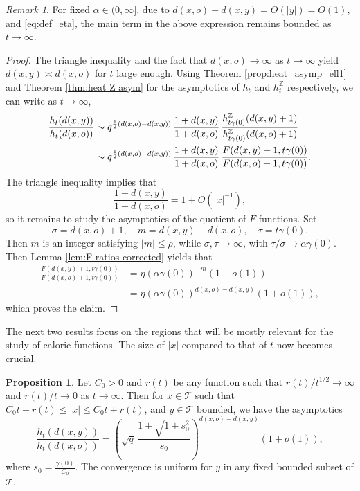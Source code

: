 \documentclass[10pt,a4paper]{amsart}
\renewcommand\mathcal{\mathscr}
\theoremstyle{plain}
\theoremstyle{remark}
\newtheorem{remark}[theorem]{Remark}
\theoremstyle{definition}
\newtheorem{proposition}[theorem]{Proposition}
\begin{document}
\begin{remark}
    For fixed $\alpha\in(0,\infty]$, due to 
$d(x,o)-d(x,y)=O(|y|)=O(1),
$
and \eqref{eq:def_eta},
the main term in the above expression remains bounded as $t\to\infty$.
\end{remark}

    \begin{proof}  The triangle inequality and the fact that $d(x,o)\to \infty$ as $t\to \infty$ yield $d(x,y)\asymp d(x,o)$ for $t$ large enough. 
    Using Theorem \ref{prop:heat_asymp_ell1} and Theorem \ref{thm:heat Z asym} for the asymptotics of $h_t$ and $h_t^{\mathbb{Z}}$ respectively, we can write as $t\to \infty$,
		\begin{align}\label{eq:quotientforL1}
			\frac{h_{t}(d(x,y))}{h_{t}(d(x,o))}&\sim q^{\frac{1}{2}(d(x,o)-d(x,y))}\,\frac{1+d(x,y)}{1+d(x,o)}\,  \frac{h_{t\gamma(0)}^{\mathbb{Z}}(d(x,y)+1)}{h_{t\gamma(0)}^{\mathbb{Z}}(d(x,o)+1)} \notag\\
            &\sim q^{\frac{1}{2}(d(x,o)-d(x,y))}\,\frac{1+d(x,y)}{1+d(x,o)}\,  \frac{F(d(x,y)+1, t\gamma(0))}{F(d(x,o)+1, t\gamma(0))}.
		\end{align}
		The triangle inequality implies that $$\frac{1+d(x,y)}{1+d(x,o)} =1+O(|x|^{-1}),$$ so it remains to study the asymptotics of the quotient of $F$ functions. Set 
        \[
        \sigma=d(x,o)+1,\quad m=d(x,y)-d(x,o), \quad \tau=t\gamma(0).
        \]
        Then $m$ is an integer satisfying $|m|\leq \rho$, while $\sigma, \tau \to \infty$, with $\tau/\sigma \to \alpha\gamma(0)$. Then Lemma \ref{lem:F-ratios-corrected} yields that 
        \begin{align*}
        \frac{F(d(x,y)+1, t\gamma(0))}{F(d(x,o)+1, t\gamma(0))}&=\eta(\alpha\gamma(0))^{-m}(1+o(1))\\
        &=\eta(\alpha\gamma(0))^{d(x,o)-d(x,y)}(1+o(1)),
        \end{align*}
        which proves the claim.
\end{proof}


The next two results focus on the regions that will be mostly relevant for the study of caloric functions. The size of $|x|$ compared to that of $t$ now becomes crucial.
	
    \begin{proposition}\label{ratio_asym_L1}
		Let $C_0>0$ and $r(t)$ be any function such that $r(t) / t^{1 / 2} \to\infty$ and  $r(t)/t\to 0$ as $t \to\infty$. Then for $x\in \mathcal{T}$ such that $ C_0t-r(t)\leq|x|\leq C_0t+r(t)$, and $y\in \mathcal{T}$ bounded, we have the asymptotics
		\[
		\frac{h_t(d(x,y))}{h_t(d(x,o))}=\left(\sqrt{q}\, \frac{1+\sqrt{1+s_0^2}}{s_0}\right)^{d(x,o)-d(x,y)} (1+o(1)),\]
		where $s_0=\frac{\gamma(0)}{C_0}$. The convergence is uniform for $y$ in any fixed bounded subset of $\mathcal T$.
	\end{proposition}
	
\end{document}
